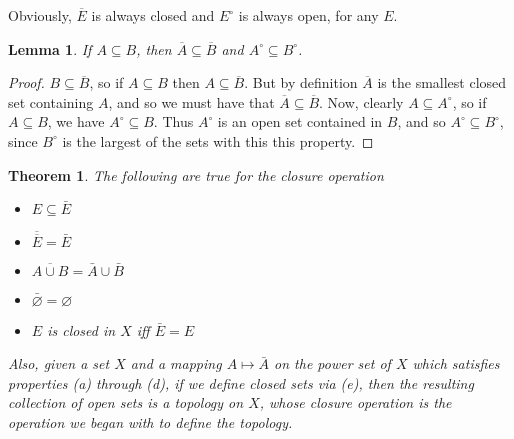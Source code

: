 \documentclass{article}
\theoremstyle{definition}
\theoremstyle{plain}
\theoremstyle{theorem}
\newtheorem{lemma}{Lemma}[section]
\newtheorem{theorem}{Theorem}[section]
\begin{document}
	Obviously, $\overline{E}$ is always closed and $E^{\circ}$ is always open, for any $E$.
	\begin{lemma}
		If $A \subseteq B$, then $\overline{A} \subseteq \overline{B}$ and $A^{\circ} \subseteq B^{\circ}$.
	\end{lemma}
	\begin{proof}
		$B \subseteq \overline{B}$, so if $A \subseteq B$ then $A \subseteq \overline{B}$. But by definition $\overline{A}$ is the smallest closed set containing $A$, and so we must have that $\overline{A} \subseteq \overline{B}$. Now, clearly $A \subseteq A^{\circ}$, so if $A \subseteq B$, we have $A^{\circ} \subseteq B$. Thus $A^{\circ}$ is an open set contained in $B$, and so $A^{\circ} \subseteq B^{\circ}$, since $B^{\circ}$ is the largest of the sets with this this property.
	\end{proof}
	\begin{theorem}
		The following are true for the closure operation
		\begin{itemize}
			\item[(a)] $E \subseteq \bar{E}$
			\item[(b)] $\overline{\overline{E}} = \bar{E}$
			\item[(c)] $\overline{A \cup B} = \bar{A} \cup \bar{B}$
			\item[(d)] $\bar{\varnothing} = \varnothing$
			\item[(e)] $E$ is closed in $X$ iff $\bar{E} = E$
		\end{itemize}
		Also, given a set $X$ and a mapping $A \mapsto \bar{A}$ on the power set of $X$ which satisfies properties (a) through (d), if we define closed sets via (e), then the resulting collection of open sets is a topology on $X$, whose closure operation is the operation we began with to define the topology.  
	\end{theorem}
\end{document}
